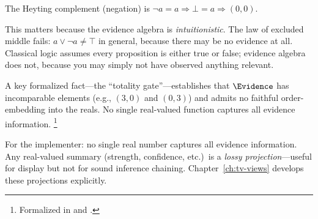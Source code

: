 \documentclass[11pt,openany]{report}
\begin{document}
The Heyting complement (negation) is $\neg a = a \Rightarrow \bot = a \Rightarrow (0,0)$.

This matters because the evidence algebra is \emph{intuitionistic}.
The law of excluded middle fails:
$a \vee \neg a \ne \top$ in general, because there may be no evidence at all.
Classical logic assumes every proposition is either true or false; evidence
algebra does not, because you may simply not have observed anything relevant.

A key formalized fact---the ``totality gate''---establishes that
$\Evidence$ has incomparable elements (e.g., $(3, 0)$ and $(0, 3)$) and
admits no faithful order-embedding into the reals.  No single real-valued
function captures all evidence information.%
\footnote{Formalized in  and
.}

For the implementer: no single real number captures all evidence
information.  Any real-valued summary (strength, confidence, etc.)\ is
a \emph{lossy projection}---useful for display but not for sound
inference chaining.  Chapter~\ref{ch:tv-views} develops these projections
explicitly.
\end{document}
